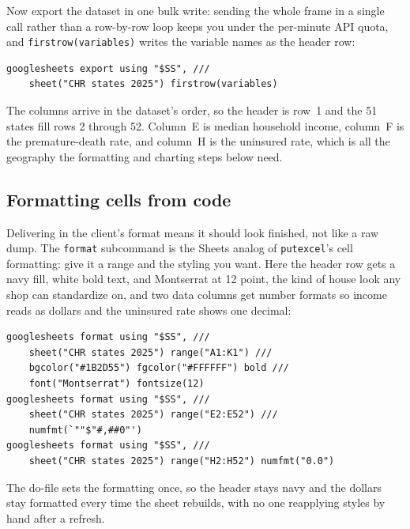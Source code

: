 \documentclass[
    a4paper,
    fontsize=10pt,
    twoside=true,
    numbers=noenddot,
]{kaobook}
\begin{document}
Now export the dataset in one bulk write: sending the whole frame in a single call rather than a row-by-row loop keeps you under the per-minute API quota, and \texttt{firstrow(variables)} writes the variable names as the header row:
\par
{\footnotesize
\begin{verbatim}
googlesheets export using "$SS", ///
    sheet("CHR states 2025") firstrow(variables)
\end{verbatim}
}
The columns arrive in the dataset's order, so the header is row~1 and the 51 states fill rows 2 through 52. Column~E is median household income, column~F is the premature-death rate, and column~H is the uninsured rate, which is all the geography the formatting and charting steps below need.

\subsection{Formatting cells from code}
Delivering in the client's format means it should look finished, not like a raw dump. The \texttt{format} subcommand is the Sheets analog of \texttt{putexcel}'s cell formatting: give it a range and the styling you want. Here the header row gets a navy fill, white bold text, and Montserrat at 12 point, the kind of house look any shop can standardize on, and two data columns get number formats so income reads as dollars and the uninsured rate shows one decimal:
\par
{\footnotesize
\begin{verbatim}
googlesheets format using "$SS", ///
    sheet("CHR states 2025") range("A1:K1") ///
    bgcolor("#1B2D55") fgcolor("#FFFFFF") bold ///
    font("Montserrat") fontsize(12)
googlesheets format using "$SS", ///
    sheet("CHR states 2025") range("E2:E52") ///
    numfmt(`""$"#,##0"')
googlesheets format using "$SS", ///
    sheet("CHR states 2025") range("H2:H52") numfmt("0.0")
\end{verbatim}
}
The do-file sets the formatting once, so the header stays navy and the dollars stay formatted every time the sheet rebuilds, with no one reapplying styles by hand after a refresh.
\end{document}
